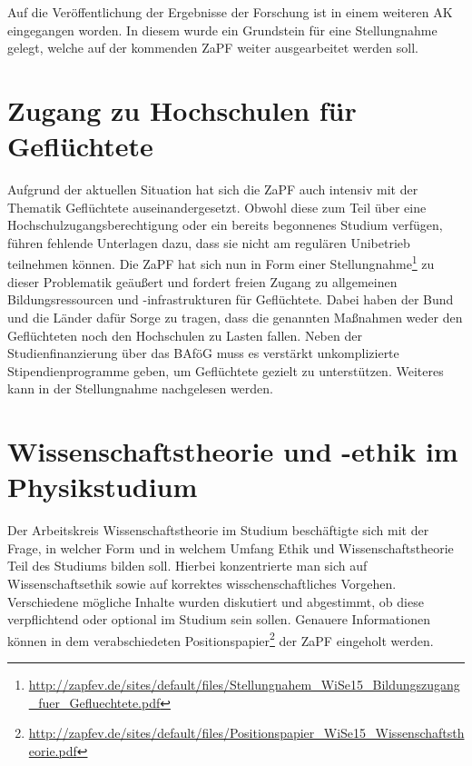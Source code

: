 Auf die Veröffentlichung der Ergebnisse der Forschung ist in einem weiteren AK
eingegangen worden. In diesem wurde ein Grundstein für eine Stellungnahme
gelegt, welche auf der kommenden ZaPF weiter ausgearbeitet werden soll.

\section*{Zugang zu Hochschulen für Geflüchtete}
Aufgrund der aktuellen Situation hat sich die ZaPF auch intensiv mit der
Thematik \glqq{}Geflüchtete\grqq{} auseinandergesetzt. Obwohl diese zum Teil
über eine Hochschulzugangsberechtigung oder ein bereits begonnenes Studium
verfügen, führen fehlende Unterlagen dazu, dass sie nicht am regulären
Unibetrieb teilnehmen können. Die ZaPF hat sich nun in Form einer
Stellungnahme\footnote{\href{http://zapfev.de/sites/default/files/Stellungnahem\_WiSe15\_Bildungszugang\_fuer\_Gefluechtete.pdf}{\url{http://zapfev.de/sites/default/files/Stellungnahem\_WiSe15\_Bildungszugang\_fuer\_Gefluechtete.pdf}}}
zu dieser Problematik geäußert und fordert freien Zugang zu allgemeinen
Bildungsressourcen und -infrastrukturen für Geflüchtete. Dabei haben der Bund
und die Länder dafür Sorge zu tragen, dass die genannten Maßnahmen weder den
Geflüchteten noch den Hochschulen zu Lasten fallen. Neben der
Studienfinanzierung über das BAföG muss es verstärkt unkomplizierte
Stipendienprogramme geben, um Geflüchtete gezielt zu unterstützen. Weiteres kann
in der Stellungnahme nachgelesen werden.

\section*{Wissenschaftstheorie und -ethik im Physikstudium}
Der  Arbeitskreis \glqq{}Wissenschaftstheorie im Studium\grqq{} beschäftigte
sich mit der Frage, in welcher Form und in welchem Umfang Ethik und
Wissenschaftstheorie Teil des Studiums bilden soll. Hierbei konzentrierte man
sich auf Wissenschaftsethik sowie auf korrektes wisschenschaftliches Vorgehen.
Verschiedene mögliche Inhalte wurden diskutiert und abgestimmt, ob diese
verpflichtend oder optional im Studium sein sollen. Genauere Informationen
können in dem verabschiedeten
Positionspapier\footnote{\href{http://zapfev.de/sites/default/files/Positionspapier\_WiSe15\_Wissenschaftstheorie.pdf}{\url{http://zapfev.de/sites/default/files/Positionspapier\_WiSe15\_Wissenschaftstheorie.pdf}}}
der ZaPF eingeholt werden.

